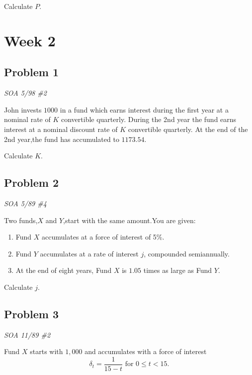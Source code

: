 \documentclass[
]{book}
\begin{document}
Calculate \(P\).

\hypertarget{week-2}{%
\section*{Week 2}\label{week-2}}

\hypertarget{problem-1-1}{%
\subsection*{Problem 1}\label{problem-1-1}}

\emph{SOA 5/98 \#2}

John invests \(1000\) in a fund which earns interest during the first year at a nominal rate of \(K\) convertible quarterly. During the 2nd year the fund earns interest at a nominal discount rate of \(K\) convertible quarterly. At the end of the 2nd year,the fund has accumulated to \(1173.54\).

Calculate \(K\).

\hypertarget{problem-2-1}{%
\subsection*{Problem 2}\label{problem-2-1}}

\emph{SOA 5/89 \#4}

Two funds,\(X\) and \(Y\),start with the same amount.You are given:

\begin{enumerate}
\def\labelenumi{\arabic{enumi}.}
\item
  Fund \(X\) accumulates at a force of interest of 5\%.
\item
  Fund \(Y\) accumulates at a rate of interest \(j\), compounded semiannually.
\item
  At the end of eight years, Fund \(X\) is \(1.05\) times as large as Fund \(Y\).
\end{enumerate}

Calculate \(j\).

\hypertarget{problem-3-1}{%
\subsection*{Problem 3}\label{problem-3-1}}

\emph{SOA 11/89 \#2}

Fund \(X\) starts with \(1,000\) and accumulates with a force of interest \[\delta_{t}=\frac{1}{15-t} \text{ for } 0 \le t< 15.\]
\end{document}
